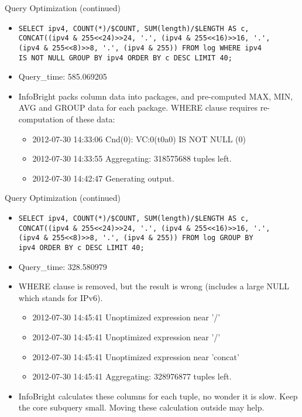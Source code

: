 \documentclass{beamer}
\begin{document}
\begin{frame}[fragile]{Query Optimization (continued)}
\begin{itemize}
  \item {\small
\begin{verbatim}
SELECT ipv4, COUNT(*)/$COUNT, SUM(length)/$LENGTH AS c,
CONCAT((ipv4 & 255<<24)>>24, '.', (ipv4 & 255<<16)>>16, '.',
(ipv4 & 255<<8)>>8, '.', (ipv4 & 255)) FROM log WHERE ipv4
IS NOT NULL GROUP BY ipv4 ORDER BY c DESC LIMIT 40;
\end{verbatim}
}
  \item Query\_time: 585.069205
  \item InfoBright packs column data into packages, and pre-computed MAX, MIN, AVG and GROUP data for each package. WHERE clause requires re-computation of these data:
  \begin{itemize}
    \item 2012-07-30 14:33:06 Cnd(0):   VC:0(t0a0) IS NOT NULL        (0)
    \item 2012-07-30 14:33:55 Aggregating: 318575688 tuples left.
    \item 2012-07-30 14:42:47 Generating output.
  \end{itemize}
\end{itemize}
\end{frame}

\begin{frame}[fragile]{Query Optimization (continued)}
\begin{itemize}
  \item {\small
\begin{verbatim}
SELECT ipv4, COUNT(*)/$COUNT, SUM(length)/$LENGTH AS c,
CONCAT((ipv4 & 255<<24)>>24, '.', (ipv4 & 255<<16)>>16, '.',
(ipv4 & 255<<8)>>8, '.', (ipv4 & 255)) FROM log GROUP BY
ipv4 ORDER BY c DESC LIMIT 40;
\end{verbatim}
  }
  \item Query\_time: 328.580979
  \item WHERE clause is removed, but the result is wrong (includes a large NULL which stands for IPv6).
  \begin{itemize}
    \item 2012-07-30 14:45:41 Unoptimized expression near '/'
    \item 2012-07-30 14:45:41 Unoptimized expression near '/'
    \item 2012-07-30 14:45:41 Unoptimized expression near 'concat'
    \item 2012-07-30 14:45:41 Aggregating: 328976877 tuples left.
  \end{itemize}
  \item InfoBright calculates these columns for each tuple, no wonder it is slow. Keep the core subquery small. Moving these calculation outside may help.
\end{itemize}
\end{frame}
\end{document}
